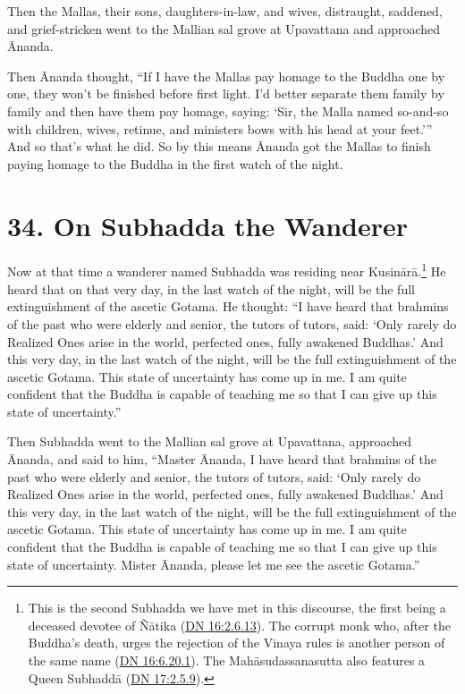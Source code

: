 \documentclass[12pt,openany]{book}%
\begin{document}
Then the Mallas, their sons, daughters-in-law, and wives, distraught, saddened, and grief-stricken went to the Mallian sal grove at Upavattana and approached Ānanda. 

Then Ānanda thought, “If I have the Mallas pay homage to the Buddha one by one, they won’t be finished before first light. I’d better separate them family by family and then have them pay homage, saying: ‘Sir, the Malla named so-and-so with children, wives, retinue, and ministers bows with his head at your feet.’” And so that’s what he did. So by this means Ānanda got the Mallas to finish paying homage to the Buddha in the first watch of the night. 

\section*{34. On Subhadda the Wanderer }

Now at that time a wanderer named Subhadda was residing near \textsanskrit{Kusinārā}.\footnote{This is the second Subhadda we have met in this discourse, the first being a deceased devotee of \textsanskrit{Ñātika} (\href{https://suttacentral.net/dn16/en/sujato\#2.6.13}{DN 16:2.6.13}). The corrupt monk who, after the Buddha’s death, urges the rejection of the Vinaya rules is another person of the same name (\href{https://suttacentral.net/dn16/en/sujato\#6.20.1}{DN 16:6.20.1}). The \textsanskrit{Mahāsudassanasutta} also features a Queen \textsanskrit{Subhaddā} (\href{https://suttacentral.net/dn17/en/sujato\#2.5.9}{DN 17:2.5.9}). } He heard that on that very day, in the last watch of the night, will be the full extinguishment of the ascetic Gotama. He thought: “I have heard that brahmins of the past who were elderly and senior, the tutors of tutors, said: ‘Only rarely do Realized Ones arise in the world, perfected ones, fully awakened Buddhas.’ And this very day, in the last watch of the night, will be the full extinguishment of the ascetic Gotama. This state of uncertainty has come up in me. I am quite confident that the Buddha is capable of teaching me so that I can give up this state of uncertainty.” 

Then Subhadda went to the Mallian sal grove at Upavattana, approached Ānanda, and said to him, “Master Ānanda, I have heard that brahmins of the past who were elderly and senior, the tutors of tutors, said: ‘Only rarely do Realized Ones arise in the world, perfected ones, fully awakened Buddhas.’ And this very day, in the last watch of the night, will be the full extinguishment of the ascetic Gotama. This state of uncertainty has come up in me. I am quite confident that the Buddha is capable of teaching me so that I can give up this state of uncertainty. Mister Ānanda, please let me see the ascetic Gotama.” 
\end{document}
